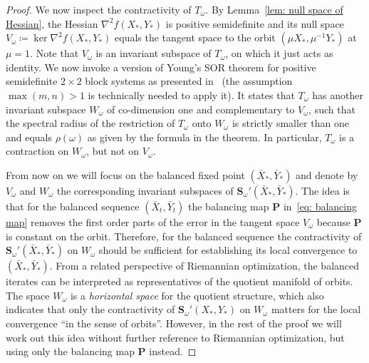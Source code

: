 \documentclass[a4paper]{article}
\newcommand{\bS}{\mathbf{S}}
\newcommand{\bP}{\mathbf{P}}
\theoremstyle{definition}
\numberwithin{equation}{section}
\begin{document}
\begin{proof}
We now inspect the contractivity of $T_\omega$. By Lemma~\ref{lem: null space of Hessian}, the Hessian $\nabla^2 f(X_*,Y_*)$ is positive semidefinite and its null space $V_\omega \coloneqq \ker \nabla^2 f(X_*,Y_*)$ equals the tangent space to the orbit $(\mu X_*, \mu^{-1} Y_*)$ at $\mu = 1$. Note that $V_\omega$ is an invariant subspace of $T_\omega$, on which it just acts as identity. We now invoke a version of Young's SOR theorem for positive semidefinite $2 \times 2$ block systems as presented in~\cite[Lemma~1]{Oseledets2023} (the assumption $\max(m,n) > 1$ is technically needed to apply it). It states that $T_\omega$ has another invariant subspace $W_\omega$ of co-dimension one and complementary to $V_\omega$, such that the spectral radius of the restriction of $T_\omega$ onto $W_\omega$ is strictly smaller than one and equals $\rho(\omega)$ as given by the formula in the theorem. In particular, $T_\omega$ is a contraction on $W_\omega$, but not on $V_\omega$.
    
From now on we will focus on the balanced fixed point $(\bar X_*, \bar Y_*)$ and denote by $V_\omega$ and $W_\omega$ the corresponding invariant subspaces of $\bS_\omega'(\bar X_*, \bar Y_*)$. The idea is that for the balanced sequence $(\bar X_t, \bar Y_t)$ the balancing map $\bP$ in~\eqref{eq: balancing map} removes the first order parts of the error in the tangent space $V_\omega$ because $\bP$ is constant on the orbit. Therefore, for the balanced sequence the contractivity of $\bS_\omega'(\bar X_*,\bar Y_*)$ on $W_\omega$ should be sufficient for establishing its local convergence to $(\bar X_*, \bar Y_*)$. From a related perspective of Riemannian optimization, the balanced iterates can be interpreted as representatives of the quotient manifold of orbits. The space $W_\omega$ is a \emph{horizontal space} for the quotient structure, which also indicates that only the contractivity of $\bS_\omega'(X_*,Y_*)$ on $W_\omega$ matters for the local convergence ``in the sense of orbits''. However, in the rest of the proof we will work out this idea without further reference to Riemannian optimization, but using only the balancing map $\bP$ instead.
    

\end{proof}
\end{document}
